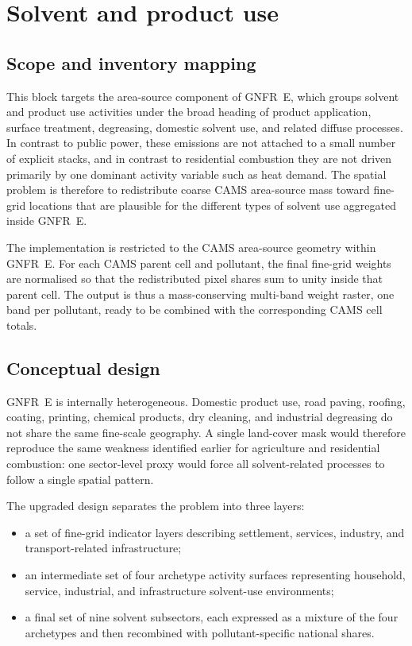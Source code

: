 \section{Solvent and product use}
\label{sec:solvents}

\subsection{Scope and inventory mapping}

This block targets the area-source component of GNFR~E, which groups
solvent and product use activities under the broad heading of product
application, surface treatment, degreasing, domestic solvent use, and
related diffuse processes. In contrast to public power, these emissions
are not attached to a small number of explicit stacks, and in contrast
to residential combustion they are not driven primarily by one dominant
activity variable such as heat demand. The spatial problem is therefore
to redistribute coarse CAMS area-source mass toward fine-grid locations
that are plausible for the different types of solvent use aggregated
inside GNFR~E.

The implementation is restricted to the CAMS area-source geometry
within GNFR~E. For each CAMS parent cell and pollutant, the final
fine-grid weights are normalised so that the redistributed pixel shares
sum to unity inside that parent cell. The output is thus a
mass-conserving multi-band weight raster, one band per pollutant, ready
to be combined with the corresponding CAMS cell totals.

\subsection{Conceptual design}

GNFR~E is internally heterogeneous. Domestic product use, road paving,
roofing, coating, printing, chemical products, dry cleaning, and
industrial degreasing do not share the same fine-scale geography.
A single land-cover mask would therefore reproduce the same weakness
identified earlier for agriculture and residential combustion: one
sector-level proxy would force all solvent-related processes to follow a
single spatial pattern.

The upgraded design separates the problem into three layers:
\begin{itemize}
  \item a set of fine-grid indicator layers describing settlement,
        services, industry, and transport-related infrastructure;
  \item an intermediate set of four archetype activity surfaces
        representing household, service, industrial, and infrastructure
        solvent-use environments;
  \item a final set of nine solvent subsectors, each expressed as a
        mixture of the four archetypes and then recombined with
        pollutant-specific national shares.
\end{itemize}

